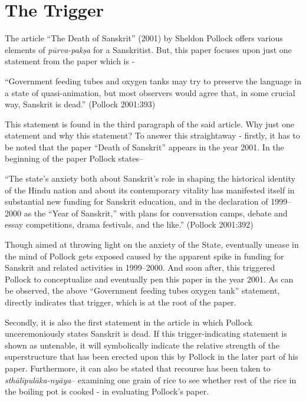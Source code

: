 \section{The Trigger}
 
The article “The Death of Sanskrit” (2001) by Sheldon Pollock offers various elements of {\sl pūrva-pakṣa} for a Sanskritist. But, this paper focuses upon just one statement from the paper which is - 
\smallskip
\begin{myquote}
\eleven
“Government feeding tubes and oxygen tanks may try to preserve the language in a state of quasi-animation, but most observers would agree that, in some crucial way, Sanskrit is dead.” \hfill(Pollock 2001:393)
\end{myquote}
\smallskip

This statement is found in the third paragraph of the said article. Why just one statement and why this statement?  To answer this straightaway - firstly, it has to be noted that the paper ``Death of Sanskrit'' appears in the year 2001.  In the beginning of the paper Pollock states–
\smallskip

\begin{myquote}
\eleven
“The state’s anxiety both about Sanskrit’s role in shaping the historical identity of the Hindu nation and about its contemporary vitality has manifested itself in substantial new funding for Sanskrit education, and in the declaration of 1999--2000 as the “Year of Sanskrit,” with plans for conversation camps, debate and essay competitions, drama festivals, and the like.” \hfill (Pollock 2001:392)  
\end{myquote}
\smallskip
 
Though aimed at throwing light on the anxiety of the State, eventually unease in the mind of Pollock gets exposed caused by the apparent spike in funding for Sanskrit and related activities in 1999--2000. And soon after, this triggered Pollock to conceptualize and eventually pen this paper in the year 2001. As can be observed, the above “Government feeding tubes oxygen tank” statement, directly indicates that trigger, which is at the root of the paper.

Secondly, it is also the first statement in the article in which Pollock unceremoniously states Sanskrit is dead. If this trigger-indicating statement is shown as untenable, it will symbolically indicate the relative strength of the superstructure that has been erected upon this by Pollock in the later part of his paper. Furthermore, it can also be stated that recourse has been taken to {\sl sthālīpulāka-nyāya}– examining one grain of rice to see whether rest of the rice in the boiling pot is cooked - in evaluating Pollock’s paper.

